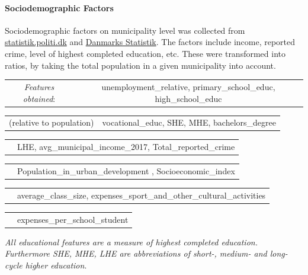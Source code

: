 \documentclass[12pt,a4paper]{article}
\begin{document}
\paragraph{Sociodemographic Factors\newline}
Sociodemographic factors on municipality level was collected from \href{https://statistik.politi.dk/QvAJAXZfc/opendoc.htm?document=QlikApplication%2F2999_Public\%2FPublic_IndsatsResultater.qvw}{statistik.politi.dk} and  
\href{https://www.dst.dk/da/Statistik/emner/befolkning-og-valg}{Danmarks Statistik}. The factors include income, reported crime, level of highest completed education, etc. These were transformed into ratios, by taking the total population in a given municipality into account.   
 \vspace*{5px} \newline
\begin{tabular}{c c}
\textit{Features obtained}: & unemployment\_relative, primary\_school\_educ, high\_school\_educ \\	
\end{tabular}\newline 
\begin{tabular}{c c}
\small (relative to population) & vocational\_educ,	 SHE, 	MHE, bachelors\_degree  \\	
\end{tabular}\newline 
\begin{tabular}{c c}
\qquad \qquad \qquad \qquad \quad & LHE, avg\_municipal\_income\_2017, Total\_reported\_crime\\	
\end{tabular}\newline 
\begin{tabular}{c c}
\qquad \qquad \qquad \qquad \quad & Population\_in\_urban\_development  , Socioeconomic\_index \\	
\end{tabular}\newline 
\begin{tabular}{c c}
\qquad \qquad \qquad \qquad \quad & average\_class\_size,	expenses\_sport\_and\_other\_cultural\_activities	  \\	
\end{tabular}\newline 
\begin{tabular}{c c}
\qquad \qquad \qquad \qquad \quad & expenses\_per\_school\_student	   \\	
\end{tabular}\newline 
\footnotesize{\textit{All educational features are a measure of highest completed education. Furthermore SHE, MHE, LHE are abbreviations of short-, medium- and long-cycle higher education}}. 
\normalsize
\end{document}

